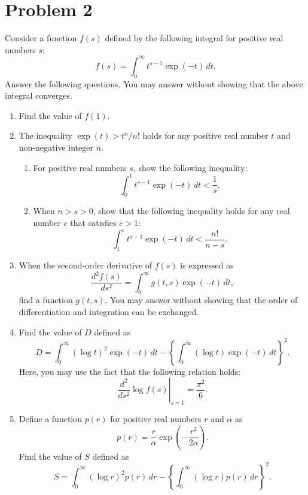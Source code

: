 \documentclass[10pt,a4paper]{article}
\begin{document}
\section*{Problem 2}

Consider a function $f(s)$ defined by the following integral for positive real numbers $s$:
\[
  f(s)=\int_0^\infty t^{s-1}\exp(-t)\,dt.
\]
Answer the following questions. You may answer without showing that the above integral converges.

\begin{enumerate}
  \item Find the value of $f(1)$.

  \item The inequality $\exp(t)>t^n/n!$ holds for any positive real number $t$ and non-negative integer $n$.
        \begin{enumerate}
          \item For positive real numbers $s$, show the following inequality:
                \[
                  \int_0^1 t^{s-1}\exp(-t)\,dt<\frac{1}{s}.
                \]
          \item When $n>s>0$, show that the following inequality holds for any real number $c$ that satisfies $c>1$:
                \[
                  \int_1^c t^{s-1}\exp(-t)\,dt<\frac{n!}{n-s}.
                \]
        \end{enumerate}

  \item When the second-order derivative of $f(s)$ is expressed as
        \[
          \frac{d^2f(s)}{ds^2}=\int_0^\infty g(t,s)\exp(-t)\,dt,
        \]
        find a function $g(t,s)$. You may answer without showing that the order of differentiation and integration can be exchanged.

  \item Find the value of $D$ defined as
        \[
          D=\int_0^\infty(\log t)^2\exp(-t)\,dt
          -
          \left\{\int_0^\infty(\log t)\exp(-t)\,dt\right\}^2.
        \]
        Here, you may use the fact that the following relation holds:
        \[
          \left.\frac{d^2}{ds^2}\log f(s)\right|_{s=1}=\frac{\pi^2}{6}.
        \]

  \item Define a function $p(r)$ for positive real numbers $r$ and $\alpha$ as
        \[
          p(r)=\frac{r}{\alpha}\exp\left(-\frac{r^2}{2\alpha}\right).
        \]
        Find the value of $S$ defined as
        \[
          S=\int_0^\infty(\log r)^2p(r)\,dr
          -
          \left\{\int_0^\infty(\log r)p(r)\,dr\right\}^2.
        \]
\end{enumerate}
\end{document}
